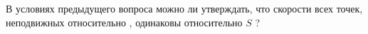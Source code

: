 В условиях предыдущего вопроса можно ли утверждать, что скорости
всех точек, неподвижных относительно  , одинаковы относительно $S$ ?
